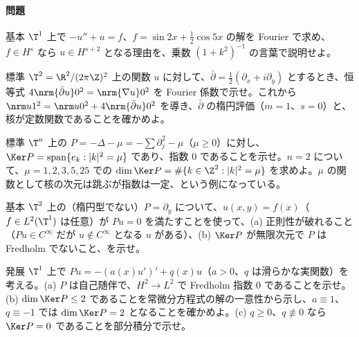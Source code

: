 \paragraph{問題}
\begin{prob}{基本}\label{p:solveFourier}
$\T^1$ 上で $-u''+u=f$、$f=\sin 2x+\tfrac12\cos 5x$ の解を Fourier で求め、$f\in H^s$ なら $u\in H^{s+2}$ となる理由を、乗数 $(1+k^2)^{-1}$ の言葉で説明せよ。
\end{prob}
\begin{prob}{標準}\label{p:bochner}
$\T^2=\R^2/(2\pi\Z)^2$ 上の関数 $u$ に対して、$\bar\partial=\frac12(\partial_x+i\partial_y)$ とするとき、恒等式 $4\nrm{\bar\partial u}0^2=\nrm{\nabla u}0^2$ を Fourier 係数で示せ。これから $\nrm u1^2=\nrm u0^2+4\nrm{\bar\partial u}0^2$ を導き、$\bar\partial$ の楕円評価（$m=1$、$s=0$）と、核が定数関数であることを確かめよ。
\end{prob}
\begin{prob}{標準}\label{p:Deltamu}
$\T^n$ 上の $P=-\Delta-\mu=-\sum\partial_j^2-\mu$（$\mu\ge0$）に対し、$\Ker P=\operatorname{span}\{e_k:|k|^2=\mu\}$ であり、指数 $0$ であることを示せ。$n=2$ について、$\mu=1,2,3,5,25$ での $\dim\Ker P=\#\{k\in\Z^2:|k|^2=\mu\}$ を求めよ。$\mu$ の関数として核の次元は跳ぶが指数は一定、という例になっている。
\end{prob}
\begin{prob}{基本}\label{p:nonell}
$\T^2$ 上の（楕円型でない）$P=\partial_y$ について、$u(x,y)=f(x)$（$f\in L^2(\T^1)$ は任意）が $Pu=0$ を満たすことを使って、(a) 正則性が破れること（$Pu\in C^\infty$ だが $u\notin C^\infty$ となる $u$ がある）、(b) $\Ker P$ が無限次元で $P$ は Fredholm でないこと、を示せ。
\end{prob}
\begin{prob}{発展}\label{p:laxsturm}
$\T^1$ 上で $Pu=-(a(x)u')'+q(x)u$（$a>0$、$q$ は滑らかな実関数）を考える。(a) $P$ は自己随伴で、$H^2\to L^2$ で Fredholm 指数 $0$ であることを示せ。(b) $\dim\Ker P\le2$ であることを常微分方程式の解の一意性から示し、$a\equiv1$、$q\equiv-1$ では $\dim\Ker P=2$ となることを確かめよ。(c) $q\ge0$、$q\not\equiv0$ なら $\Ker P=0$ であることを部分積分で示せ。
\end{prob}
